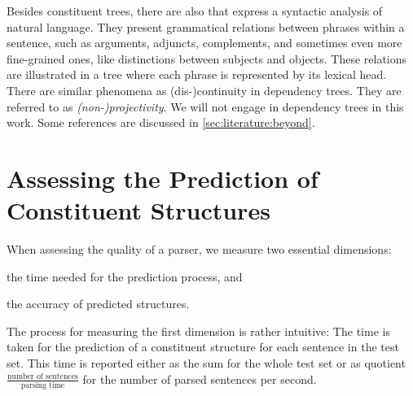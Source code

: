 \documentclass[../document.tex]{subfiles}
\begin{document}
    Besides constituent trees, there are also  that express a syntactic analysis of natural language.
    They present grammatical relations between phrases within a sentence, such as arguments, adjuncts, complements, and sometimes even more fine-grained ones, like distinctions between subjects and objects.
    These relations are illustrated in a tree where each phrase is represented by its lexical head.
    There are similar phenomena as (dis-)continuity in dependency trees. They are referred to as \emph{(non-)projectivity}.
    We will not engage in dependency trees in this work. Some references are discussed in \cref{sec:literature:beyond}.

    \section{Assessing the Prediction of Constituent Structures}
    When assessing the quality of a parser, we measure two essential dimensions:
    \begin{inparaenum}
        \item the time needed for the prediction process, and
        \item the accuracy of predicted structures.
    \end{inparaenum}
    The process for measuring the first dimension is rather intuitive:
        The time is taken for the prediction of a constituent structure for each sentence in the test set.
    This time is reported either as the sum for the whole test set or as quotient \(\frac{\text{number of sentences}}{\text{parsing time}}\) for the number of parsed sentences per second.
\end{document}
